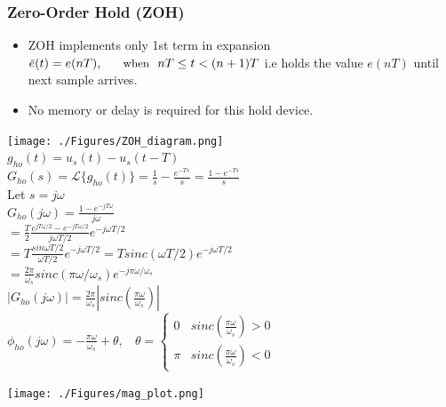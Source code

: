 \documentclass[mathserif, 10pt]{beamer} %
\begin{document}
{

\small

\frametitle{Zero-Order Hold (ZOH)}
\vspace{-.5in}
\begin{itemize}	\item ZOH implements only 1st term in expansion $\bar e(t) = e(nT), ~~~~~ \text{\small{when}}~~  nT \leq t< (n+1)T$ i.e holds the value $e(nT)$ until next sample arrives.
	\item No memory or delay is required for this hold device.

\end{itemize}
\texttt{[image: ./Figures/ZOH\_diagram.png]}  \\
	 $g_{ho}(t) = u_s(t)-u_s(t-T)$\\
		$G_{ho}(s) = \mathscr{L}\{g_{ho}(t)\} = \frac{1}{s}-\frac{e^{-Ts}}{s} = \frac{1-e^{-Ts}}{s}$\\
Let $s=j\omega$\\
$G_{ho}(j\omega) = \frac{1-e^{-jT\omega}}{j\omega} $\\
$= \frac{T}{2}\frac{e^{jT\omega/2}-e^{-jT\omega/2}}{j\omega T/2}e^{-j\omega T/2}$ \\
$ = T \frac{sin \omega T/2}{\omega T/2} e^{-j\omega T/2} =Tsinc(\omega T/2)e^{-j\omega T/2}$\\
$ =\frac{2\pi}{\omega_s} sinc(\pi \omega /\omega_s)e^{-j \pi \omega/\omega_s}$\\

$|G_{ho}(j\omega)| = \frac{2\pi}{\omega_s}|sinc(\frac{\pi \omega}{\omega_s})|$\\
$\phi_{ho}(j\omega) = -\frac{\pi \omega}{\omega_s}+\theta,~~~~\theta = \left \{
\begin{array}{lr}
 	0&sinc(\frac{\pi \omega}{\omega_s})>0\\
	\pi&sinc(\frac{\pi \omega}{\omega_s})<0
\end{array} \right.$

\vspace{-2.5in}
\hspace{2.5in}
	\texttt{[image: ./Figures/mag\_plot.png]}




}
\end{document}
